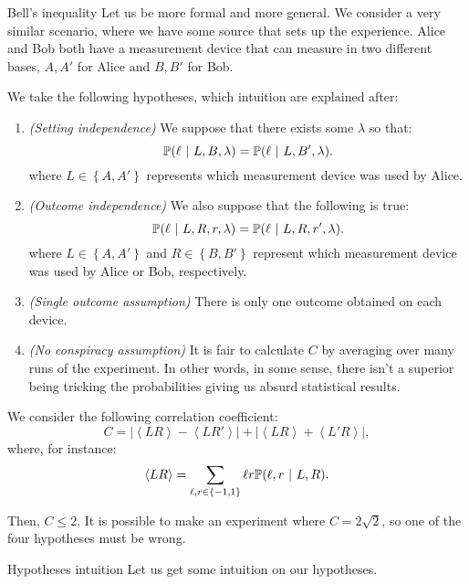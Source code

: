 \documentclass[a4paper]{article}
\begin{document}
\begin{parag}{Bell's inequality}
    Let us be more formal and more general. We consider a very similar scenario, where we have some source that sets up the experience. Alice and Bob both have a measurement device that can measure in two different bases, $A, A'$ for Alice and $B, B'$ for Bob. 

    We take the following hypotheses, which intuition are explained after:
    \begin{enumerate}
        \item \textit{(Setting independence)} We suppose that there exists some $\lambda$ so that: 
        \[\prob\left(\ell \suchthat L, B, \lambda\right) = \prob\left(\ell \suchthat L, B', \lambda\right).\]
        where $L \in \left\{A, A'\right\}$ represents which measurement device was used by Alice.
        \item \textit{(Outcome independence)} We also suppose that the following is true:
        \[\prob\left(\ell \suchthat L, R, r, \lambda\right) = \prob\left(\ell \suchthat L, R, r', \lambda\right).\]
        where $L \in \left\{A, A'\right\}$ and $R \in \left\{B, B'\right\}$ represent which measurement device was used by Alice or Bob, respectively.
        \item \textit{(Single outcome assumption)} There is only one outcome obtained on each device.
        \item \textit{(No conspiracy assumption)} It is fair to calculate $C$ by averaging over many runs of the experiment. In other words, in some sense, there isn't a superior being tricking the probabilities giving us absurd statistical results.
    \end{enumerate}

    We consider the following correlation coefficient: 
    \[C = \left|\left\langle LR \right\rangle - \left\langle LR' \right\rangle\right| + \left|\left\langle LR \right\rangle + \left\langle L'R \right\rangle\right|,\]
    where, for instance: 
    \[\left\langle LR \right\rangle = \sum_{\ell, r \in \left\{-1, 1\right\}} \ell r \prob\left(\ell, r \suchthat L, R\right). \]

    Then, $C \leq 2$. It is possible to make an experiment where $C = 2 \sqrt{2}$, so one of the four hypotheses must be wrong.

    \begin{subparag}{Hypotheses intuition}
        Let us get some intuition on our hypotheses.
        

\end{subparag}
\end{parag}
\end{document}
